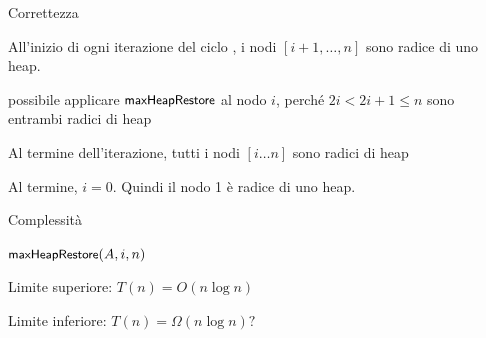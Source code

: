 \begin{frame}{Correttezza}

\vspace{-12pt}
\begin{overprint}
\begin{myboxtitle}
All'inizio di ogni iterazione del ciclo \FOR, i nodi $[i+1, \ldots, n]$ sono radice di uno heap.
\end{myboxtitle}

\begin{myboxtitle}
\BIL
\item \EE possibile applicare $\textsf{{\small maxHeapRestore}}$ al nodo $i$, perché
$2i < 2i+1 \leq n$ sono entrambi radici di heap
\item Al termine dell'iterazione, tutti i nodi $[i \ldots n]$ sono radici
di heap
\EIL
\end{myboxtitle}

\begin{myboxtitle}
\BIL
\item Al termine, $i=0$. Quindi il nodo 1 è radice di uno heap.
\EIL
\end{myboxtitle}
\end{overprint}

    
\end{frame}

\begin{frame}{Complessità}

\begin{Procedure}
\caption[A]{\heapbuild($\Item[\,]\ A$, \INTEGER $n$)}
\label{alg:heapbuild}

{
  $\textsf{{\small maxHeapRestore}}(A, i, n)$\;
}
\end{Procedure}

\pause
\BIL
\item Limite superiore: \pause $T(n) = O(n \log n)$
\item Limite inferiore: \pause $T(n) = \Omega(n \log n)?$
\EIL
\end{frame}
    
